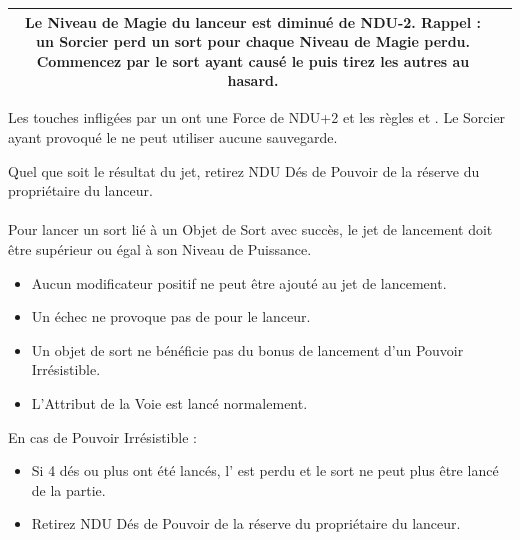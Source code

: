 {\begin{multicols}{2}
\begin{center}
\begin{tabular}{cm{6.75cm}@{}}
\vspace*{3pt}
Le Niveau de Magie du lanceur est diminué de NDU-2. Rappel : un Sorcier perd un sort pour chaque Niveau de Magie perdu. Commencez par le sort ayant causé le \miscast{} puis tirez les autres au hasard.\tabularnewline
\hline
\end{tabular}
\end{center}

\vspace*{5pt}
\noindent Les touches infligées par un \miscast{} ont une Force de NDU+2 et les règles \magicalattacks{} et . Le Sorcier ayant provoqué le \miscast{} ne peut utiliser aucune sauvegarde.

\vspace*{5pt}
\noindent Quel que soit le résultat du jet, retirez NDU Dés de Pouvoir de la réserve du propriétaire du lanceur.

\vspace*{30pt}
\begin{framed}
\vspace*{-17pt}
\paragraph{\boundspells{}}

\noindent Pour lancer un sort lié à un Objet de Sort avec succès, le jet de lancement doit être supérieur ou égal à son Niveau de Puissance.
\begin{itemize}[label={-}]
\item Aucun modificateur positif ne peut être ajouté au jet de lancement.
\item Un échec ne provoque pas de \lostfocus{} pour le lanceur.
\item Un objet de sort ne bénéficie pas du bonus de lancement d'un Pouvoir Irrésistible.
\item L'Attribut de la Voie est lancé normalement.
\end{itemize}

\noindent En cas de Pouvoir Irrésistible :
\begin{itemize}[label={-}, itemsep=3pt]
\item Si 4 dés ou plus ont été lancés, l'\boundspell{} est perdu et le sort ne peut plus être lancé de la partie.
\item Retirez NDU Dés de Pouvoir de la réserve du propriétaire du lanceur.
\end{itemize}
\end{framed}


\end{multicols}}

